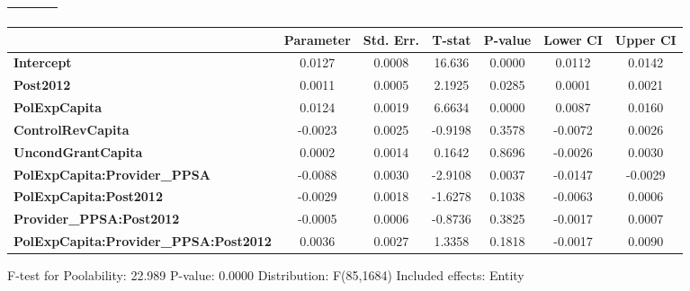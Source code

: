 \begin{center}
\begin{tabular}{lclc}
\textbf{}                                     &                    & \textbf{                     }   &                  \\
\bottomrule
\end{tabular}
\begin{tabular}{lcccccc}
                                              & \textbf{Parameter} & \textbf{Std. Err.} & \textbf{T-stat} & \textbf{P-value} & \textbf{Lower CI} & \textbf{Upper CI}  \\
\midrule
\textbf{Intercept}                            &       0.0127       &       0.0008       &      16.636     &      0.0000      &       0.0112      &       0.0142       \\
\textbf{Post2012}                             &       0.0011       &       0.0005       &      2.1925     &      0.0285      &       0.0001      &       0.0021       \\
\textbf{PolExpCapita}                         &       0.0124       &       0.0019       &      6.6634     &      0.0000      &       0.0087      &       0.0160       \\
\textbf{ControlRevCapita}                     &      -0.0023       &       0.0025       &     -0.9198     &      0.3578      &      -0.0072      &       0.0026       \\
\textbf{UncondGrantCapita}                    &       0.0002       &       0.0014       &      0.1642     &      0.8696      &      -0.0026      &       0.0030       \\
\textbf{PolExpCapita:Provider\_PPSA}          &      -0.0088       &       0.0030       &     -2.9108     &      0.0037      &      -0.0147      &      -0.0029       \\
\textbf{PolExpCapita:Post2012}                &      -0.0029       &       0.0018       &     -1.6278     &      0.1038      &      -0.0063      &       0.0006       \\
\textbf{Provider\_PPSA:Post2012}              &      -0.0005       &       0.0006       &     -0.8736     &      0.3825      &      -0.0017      &       0.0007       \\
\textbf{PolExpCapita:Provider\_PPSA:Post2012} &       0.0036       &       0.0027       &      1.3358     &      0.1818      &      -0.0017      &       0.0090       \\
\bottomrule
\end{tabular}
\end{center}

F-test for Poolability: 22.989 \newline
 P-value: 0.0000 \newline
 Distribution: F(85,1684) \newline
  \newline
 Included effects: Entity